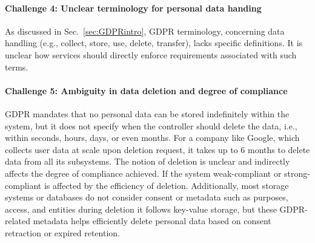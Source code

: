 \paragraph{\textbf{Challenge 4: Unclear terminology for personal data handing}} \label{chal4}
As discussed in Sec.~\ref{sec:GDPRintro}, GDPR terminology, concerning data handling (e.g., collect, store, use, delete, transfer), lacks specific definitions. It is unclear how services should directly enforce requirements associated with such terms.

\paragraph{\textbf{Challenge 5: Ambiguity in data deletion and degree of compliance}} GDPR mandates that no personal data can be stored indefinitely within the system, but it does not specify when the controller should delete the data, i.e.,  within seconds, hours, days, or even months. For a company like Google, which collects user data at scale upon deletion request, it takes up to 6 months to delete data from all its subsystems. 
The notion of deletion is unclear and indirectly affects the degree of compliance achieved. If the system weak-compliant or strong-compliant is affected by the efficiency of deletion.  Additionally, most storage systems or databases do not consider consent or metadata such as purposes, access, and entities during deletion it follows key-value storage, but these GDPR-related metadata helps efficiently delete personal data based on consent retraction or expired retention. 